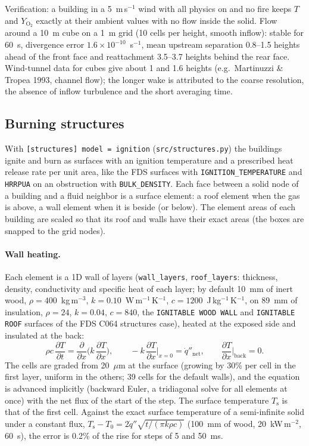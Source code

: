 \documentclass[11pt,a4paper]{article}
\newcommand{\code}[1]{\texttt{#1}}
\newcommand{\YO}{Y_{\mathrm{O_2}}}
\begin{document}
Verification: a building in a 5~m\,s$^{-1}$ wind with all physics on and no fire keeps $T$ and
$\YO$ exactly at their ambient values with no flow inside the solid. Flow around a 10~m cube on a
1~m grid (10 cells per height, smooth inflow): stable for 60~s, divergence error
$1.6\times10^{-10}$~s$^{-1}$, mean upstream separation 0.8--1.5 heights ahead of the front face and
reattachment 3.5--3.7 heights behind the rear face. Wind-tunnel data for cubes give about 1 and 1.6
heights (e.g.\ Martinuzzi \& Tropea 1993, channel flow); the longer wake is attributed to the coarse
resolution, the absence of inflow turbulence and the short averaging time.

\subsection{Burning structures}\label{sec:structures}
With \code{[structures] model = ignition} (\code{src/structures.py}) the buildings ignite and burn as surfaces
with an ignition temperature and a prescribed heat release rate per unit area, like the FDS surfaces with
\code{IGNITION\_TEMPERATURE} and \code{HRRPUA} on an obstruction with \code{BULK\_DENSITY}. Each face between a
solid node of a building and a fluid neighbor is a surface element: a roof element when the gas is above, a
wall element when it is beside (or below). The element areas of each building are scaled so that its roof
and walls have their exact areas (the boxes are snapped to the grid nodes).

\paragraph{Wall heating.} Each element is a 1D wall of layers (\code{wall\_layers}, \code{roof\_layers}:
thickness, density, conductivity and specific heat of each layer; by default 10~mm of inert wood,
$\rho=400$~kg\,m$^{-3}$, $k=0.10$~W\,m$^{-1}$\,K$^{-1}$, $c=1200$~J\,kg$^{-1}$\,K$^{-1}$, on 89~mm of insulation,
$\rho=24$, $k=0.04$, $c=840$, the \code{IGNITABLE WOOD WALL} and \code{IGNITABLE ROOF} surfaces of the FDS C064
structures case), heated at the exposed side and insulated at the back:
\begin{equation}
  \rho c\,\frac{\partial T}{\partial t}=\frac{\partial}{\partial x}\Big(k\,\frac{\partial T}{\partial x}\Big),\qquad
  -k\,\frac{\partial T}{\partial x}\Big|_{x=0}=\dot q''_\text{net},\qquad
  \frac{\partial T}{\partial x}\Big|_{\text{back}}=0.
\end{equation}
The cells are graded from 20~$\mu$m at the surface (growing by 30\% per cell in the first layer, uniform in the
others; 39 cells for the default walls), and the equation is advanced implicitly (backward Euler, a tridiagonal
solve for all elements at once) with the net flux of the start of the step. The surface temperature $T_\text{s}$
is that of the first cell. Against the exact surface temperature of a semi-infinite solid under a constant
flux, $T_\text{s}-T_0=2\dot q''\sqrt{t/(\pi k\rho c)}$ (100~mm of wood, 20~kW\,m$^{-2}$, 60~s), the error is 0.2\%
of the rise for steps of 5 and 50~ms.
\end{document}
